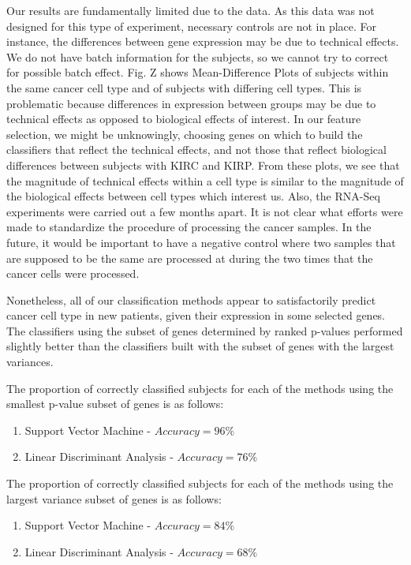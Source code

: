 Our results are fundamentally limited due to the data. As this data was not
designed for this type of experiment, necessary controls are not in place. For
instance, the differences between gene expression may be due to technical
effects. We do not have batch information for the subjects, so we cannot try 
to correct for possible batch effect. Fig. Z shows Mean-Difference Plots of
subjects within the same cancer cell type and of subjects with differing cell types.
This is problematic because differences in expression between groups may be 
due to technical effects as opposed to biological effects of interest. In our feature 
selection, we might be unknowingly, choosing genes on which to build the classifiers
that reflect the technical effects, and not those that reflect biological differences between
subjects with KIRC and KIRP.
From these plots, we see that the magnitude of technical effects within a cell type
is similar to the magnitude of the biological effects between cell types which interest
us. Also, the RNA-Seq experiments were 
carried out a few months apart. It is not clear what efforts were made to 
standardize the procedure of processing the cancer samples. In the future, 
it would be important to have a negative control where two samples that are 
supposed to be the same are processed at during the two times that the cancer 
cells were processed. 

Nonetheless, all of our classification methods appear to satisfactorily predict 
cancer cell type in new patients, given their expression in some selected genes. The classifiers
using the subset of genes determined by ranked p-values performed slightly better than the classifiers
built with the subset of genes with the largest variances.

The proportion of correctly classified subjects for each of the methods using the smallest p-value subset of
genes is as follows:
\begin{enumerate}
\item Support Vector Machine - $Accuracy = 96\%$
\item Linear Discriminant Analysis - $Accuracy = 76\%$
\end{enumerate}

The proportion of correctly classified subjects for each of the methods using the largest variance subset of
genes is as follows:
\begin{enumerate}
\item Support Vector Machine - $Accuracy = 84\% $
\item Linear Discriminant Analysis - $Accuracy =68\% $
\end{enumerate}

